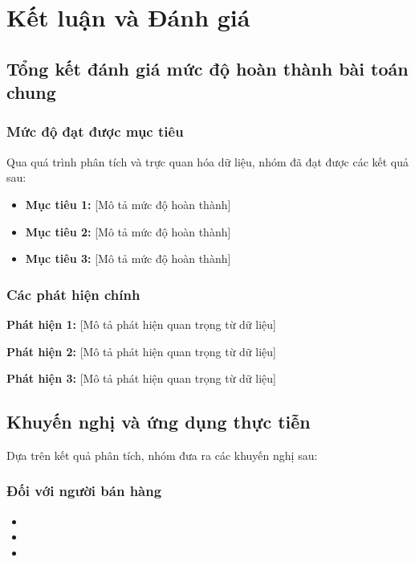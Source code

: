 \section{Kết luận và Đánh giá}

\subsection{Tổng kết đánh giá mức độ hoàn thành bài toán chung}

\subsubsection{Mức độ đạt được mục tiêu}

Qua quá trình phân tích và trực quan hóa dữ liệu, nhóm đã đạt được các kết quả sau:

\begin{itemize}
    \item \textbf{Mục tiêu 1:} [Mô tả mức độ hoàn thành]
    \item \textbf{Mục tiêu 2:} [Mô tả mức độ hoàn thành]
    \item \textbf{Mục tiêu 3:} [Mô tả mức độ hoàn thành]
\end{itemize}

\subsubsection{Các phát hiện chính}

\textbf{Phát hiện 1:} [Mô tả phát hiện quan trọng từ dữ liệu]

\textbf{Phát hiện 2:} [Mô tả phát hiện quan trọng từ dữ liệu]

\textbf{Phát hiện 3:} [Mô tả phát hiện quan trọng từ dữ liệu]

\subsection{Khuyến nghị và ứng dụng thực tiễn}

Dựa trên kết quả phân tích, nhóm đưa ra các khuyến nghị sau:

\subsubsection{Đối với người bán hàng}
\begin{itemize}
    \item [Khuyến nghị 1]
    \item [Khuyến nghị 2]
    \item [Khuyến nghị 3]
\end{itemize}


